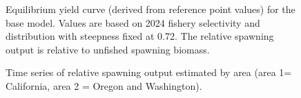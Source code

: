 \documentclass[
]{scrartcl}
\begin{document}
\begin{figure}


\caption{\label{fig-eq-yield}Equilibrium yield curve (derived from
reference point values) for the base model. Values are based on 2024
fishery selectivity and distribution with steepness fixed at 0.72. The
relative spawning output is relative to unfished spawning biomass.}

\end{figure}%

\begin{figure}


\caption{\label{fig-status-area}Time series of relative spawning output
estimated by area (area 1= California, area 2 = Oregon and Washington).}

\end{figure}%

\pagebreak



\newpage{}
\printnoidxglossaries
\end{document}
